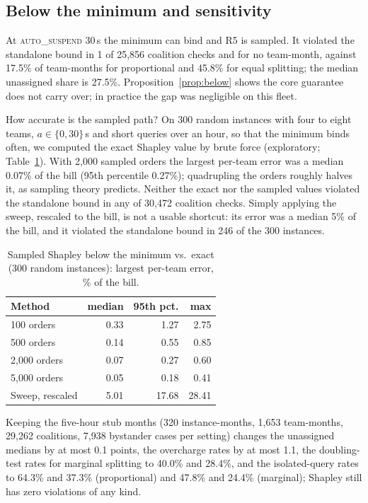 \documentclass[sigconf]{acmart}
\newcommand{\autos}{\textsc{auto\_suspend}}
\begin{document}
\subsection{Below the minimum and sensitivity}\label{sec:sens}
At \autos{} 30\,s the minimum can bind and R5 is sampled. It violated the standalone bound in 1 of 25,856 coalition checks
and for no team-month, against 17.5\% of team-months for proportional and 45.8\% for equal splitting; the median unassigned
share is 27.5\%. Proposition~\ref{prop:below} shows the core guarantee does not carry over; in practice the gap was
negligible on this fleet.

How accurate is the sampled path? On 300 random instances with four to eight teams, $a \in \{0, 30\}$\,s and short queries
over an hour, so that the minimum binds often, we computed the exact Shapley value by brute force (exploratory;
Table~\ref{tab:sampled}). With 2,000 sampled orders the largest per-team error was a median 0.07\% of the bill (95th
percentile 0.27\%); quadrupling the orders roughly halves it, as sampling theory predicts. Neither the exact nor the sampled
values violated the standalone bound in any of 30,472 coalition checks. Simply applying the sweep, rescaled to the bill,
is not a usable shortcut: its error was a median 5\% of the bill, and it violated the standalone bound in 246 of the 300
instances.

\begin{table}[t]
\caption{Sampled Shapley below the minimum vs.\ exact (300 random instances): largest per-team error, \% of the bill.}\label{tab:sampled}
\small
\begin{tabular}{lrrr}
\toprule
Method & median & 95th pct. & max \\
\midrule
100 orders   & 0.33 & 1.27 & 2.75 \\
500 orders   & 0.14 & 0.55 & 0.85 \\
2,000 orders & 0.07 & 0.27 & 0.60 \\
5,000 orders & 0.05 & 0.18 & 0.41 \\
Sweep, rescaled & 5.01 & 17.68 & 28.41 \\
\bottomrule
\end{tabular}
\end{table}
 Keeping the five-hour stub months (320 instance-months, 1,653 team-months, 29,262 coalitions,
7,938 bystander cases per setting) changes the unassigned medians by at most 0.1 points, the overcharge rates by at most
1.1, the doubling-test rates for marginal splitting to 40.0\% and 28.4\%, and the isolated-query rates to 64.3\% and 37.3\%
(proportional) and 47.8\% and 24.4\% (marginal); Shapley still has zero violations of any kind.
\end{document}
